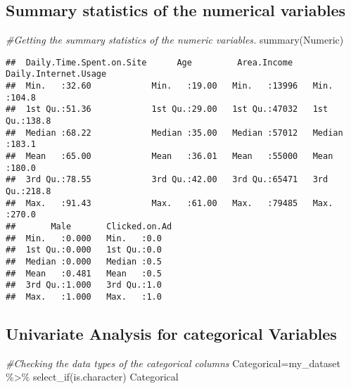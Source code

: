 \documentclass[
]{article}
\newenvironment{Shaded}{\begin{snugshade}}{\end{snugshade}}
\newcommand{\CommentTok}[1]{\textcolor[rgb]{0.56,0.35,0.01}{\textit{#1}}}
\newcommand{\FunctionTok}[1]{\textcolor[rgb]{0.00,0.00,0.00}{#1}}
\newcommand{\NormalTok}[1]{#1}
\newcommand{\OtherTok}[1]{\textcolor[rgb]{0.56,0.35,0.01}{#1}}
\newcommand{\SpecialCharTok}[1]{\textcolor[rgb]{0.00,0.00,0.00}{#1}}
\begin{document}
\hypertarget{summary-statistics-of-the-numerical-variables}{%
\subsection{Summary statistics of the numerical
variables}\label{summary-statistics-of-the-numerical-variables}}

\begin{Shaded}
\begin{Highlighting}[]
\CommentTok{\#Getting the summary statistics of the numeric variables.}
\FunctionTok{summary}\NormalTok{(Numeric)}
\end{Highlighting}
\end{Shaded}

\begin{verbatim}
##  Daily.Time.Spent.on.Site      Age         Area.Income    Daily.Internet.Usage
##  Min.   :32.60            Min.   :19.00   Min.   :13996   Min.   :104.8       
##  1st Qu.:51.36            1st Qu.:29.00   1st Qu.:47032   1st Qu.:138.8       
##  Median :68.22            Median :35.00   Median :57012   Median :183.1       
##  Mean   :65.00            Mean   :36.01   Mean   :55000   Mean   :180.0       
##  3rd Qu.:78.55            3rd Qu.:42.00   3rd Qu.:65471   3rd Qu.:218.8       
##  Max.   :91.43            Max.   :61.00   Max.   :79485   Max.   :270.0       
##       Male       Clicked.on.Ad
##  Min.   :0.000   Min.   :0.0  
##  1st Qu.:0.000   1st Qu.:0.0  
##  Median :0.000   Median :0.5  
##  Mean   :0.481   Mean   :0.5  
##  3rd Qu.:1.000   3rd Qu.:1.0  
##  Max.   :1.000   Max.   :1.0
\end{verbatim}

\hypertarget{univariate-analysis-for-categorical-variables}{%
\subsection{Univariate Analysis for categorical
Variables}\label{univariate-analysis-for-categorical-variables}}

\begin{Shaded}
\begin{Highlighting}[]
\CommentTok{\#Checking the data types of the categorical columns}
\NormalTok{Categorical}\OtherTok{=}\NormalTok{my\_dataset }\SpecialCharTok{\%\textgreater{}\%} \FunctionTok{select\_if}\NormalTok{(is.character)}
\NormalTok{Categorical}
\end{Highlighting}
\end{Shaded}
\end{document}
